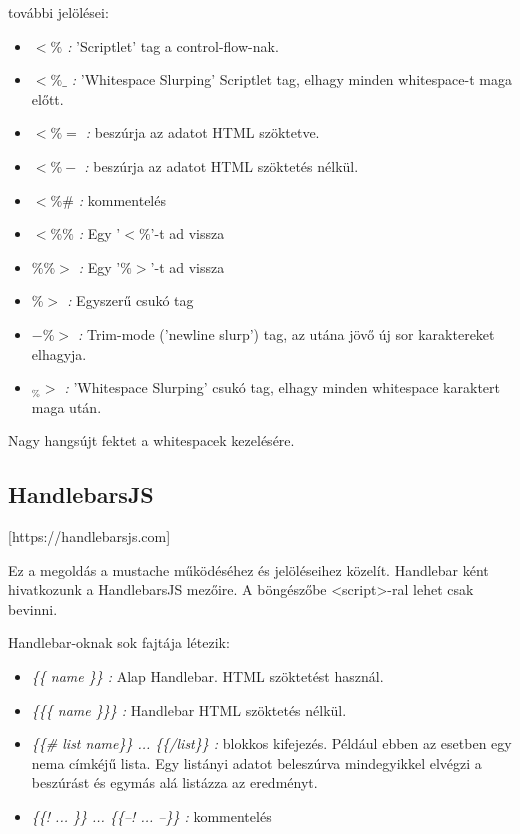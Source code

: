 további jelölései:
\begin{itemize}
\item \emph{$<\%$ :} 'Scriptlet' tag a control-flow-nak.
\item \emph{$<\%\_$ :} 'Whitespace Slurping' Scriptlet tag, elhagy minden whitespace-t maga előtt.
\item \emph{$<\%=$ :} beszúrja az adatot HTML szöktetve.
\item \emph{$<\%-$ :} beszúrja az adatot HTML szöktetés nélkül.
\item \emph{$<\%\#$ :} kommentelés
\item \emph{$<\%\%$ :} Egy '$<\%$'-t ad vissza
\item \emph{$\%\%>$ :} Egy '$\%>$'-t ad vissza
\item \emph{$\%>$ :} Egyszerű csukó tag
\item \emph{$-\%>$ :} Trim-mode ('newline slurp') tag, az utána jövő új sor karaktereket elhagyja.
\item \emph{$_\%>$ :} 'Whitespace Slurping' csukó tag, elhagy minden whitespace karaktert maga után.
\end{itemize}

Nagy hangsújt fektet a whitespacek kezelésére.


\subsection{HandlebarsJS}
[https://handlebarsjs.com]

Ez a megoldás a mustache működéséhez és jelöléseihez közelít.
Handlebar ként hivatkozunk a HandlebarsJS mezőire.
A böngészőbe <script>-ral lehet csak bevinni.


Handlebar-oknak sok fajtája létezik:
\begin{itemize}
\item \emph{\{\{ name \}\} :} 
Alap Handlebar.
HTML szöktetést használ.
\item \emph{\{\{\{ name \}\}\} :} 
Handlebar HTML szöktetés nélkül.
\item \emph{\{\{\# list name\}\} ... \{\{/list\}\} :} 
blokkos kifejezés.
Például ebben az esetben egy nema címkéjű lista.
Egy listányi adatot beleszúrva mindegyikkel elvégzi a beszúrást és egymás alá listázza az eredményt.
\item \emph{\{\{! ... \}\} ... \{\{--! ... --\}\} :} kommentelés
\end{itemize}


